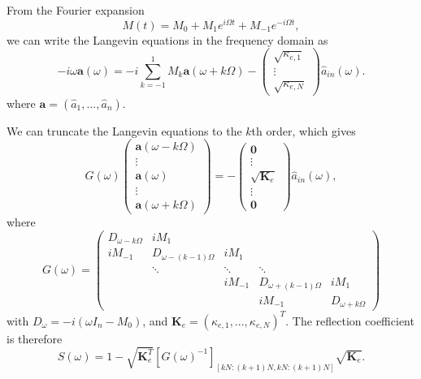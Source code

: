 \documentclass[
twocolumn,

superscriptaddress,









 amsmath,amssymb,
 aps,


prl,




]{revtex4-2}
\newcommand{\opa}{\hat{a}}
\begin{document}
From the Fourier expansion
\begin{equation}
	M(t) = M_0 + M_1 e^{i\Omega t} + M_{-1} e^{-i\Omega t} ,
\end{equation}
we can write the Langevin equations in the frequency domain as
\begin{equation}
	-i\omega \bm{a} (\omega) = -i \sum_{k=-1}^{1} M_k \bm{a} (\omega + k \Omega) -
	\begin{pmatrix} \sqrt{\kappa_{e,1}} \\ \vdots \\ \sqrt{\kappa_{e,N}} \end{pmatrix} \opa_{in} (\omega) .
\end{equation}
where $\bm{a} = (\opa_1,...,\opa_n)$.

We can truncate the Langevin equations to the $k$th order, which gives
\begin{equation}
	G (\omega)
	\begin{pmatrix}
		\bm{a} (\omega - k\Omega) \\
		\vdots \\
		\bm{a} (\omega) \\
		\vdots \\
		\bm{a} (\omega + k\Omega)
	\end{pmatrix}
	= -\begin{pmatrix}
		\bm{0} \\
		\vdots \\
		\sqrt{\mathbf{K}_e} \\
		\vdots \\
		\bm{0}
	\end{pmatrix}
	\opa_{in} (\omega) ,
\end{equation}
where
\begin{equation}
	G (\omega) =
	\begin{pmatrix}
		D_{\omega-k\Omega} & i M_1 & & & \\
		i M_{-1} & D_{\omega-(k-1)\Omega} & i M_1 & & \\
		& \ddots & \ddots & \ddots & \\
		& & i M_{-1} & D_{\omega+(k-1)\Omega} & i M_1 \\
		& & & i M_{-1} & D_{\omega+k\Omega}
	\end{pmatrix}
\end{equation}
with $D_\omega = -i (\omega I_n - M_0)$, and $\mathbf{K}_e = (\kappa_{e,1},...,\kappa_{e,N})^T$. The reflection coefficient is therefore
\begin{equation}
	S(\omega) = 1 - \sqrt{\mathbf{K}_e^T} \left[ G(\omega)^{-1}  \right]_{[kN:(k+1)N, kN:(k+1)N]} \sqrt{\mathbf{K}_e} .
\end{equation}
\end{document}
